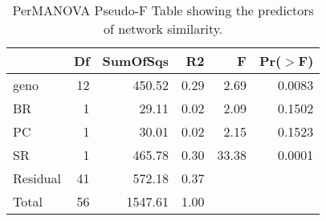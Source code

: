 \begin{table}[ht]
\centering
\begin{tabular}{lrrrrr}
  \hline
 & Df & SumOfSqs & R2 & F & Pr($>$F) \\ 
  \hline
geno & 12 & 450.52 & 0.29 & 2.69 & 0.0083 \\ 
  BR & 1 & 29.11 & 0.02 & 2.09 & 0.1502 \\ 
  PC & 1 & 30.01 & 0.02 & 2.15 & 0.1523 \\ 
  SR & 1 & 465.78 & 0.30 & 33.38 & 0.0001 \\ 
  Residual & 41 & 572.18 & 0.37 &  &  \\ 
  Total & 56 & 1547.61 & 1.00 &  &  \\ 
   \hline
\end{tabular}
\caption{PerMANOVA Pseudo-F Table showing the predictors of network similarity.} 
\label{tab:cn_perm}
\end{table}
